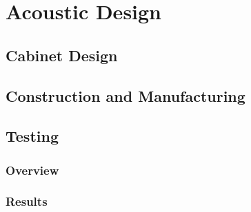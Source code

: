 \documentclass[main.tex]{subfiles}
\begin{document}
\chapter{Acoustic Design}
\section{Cabinet Design}
\section{Construction and Manufacturing}
\section{Testing}
\subsection{Overview}
\subsection{Results}
\end{document}
